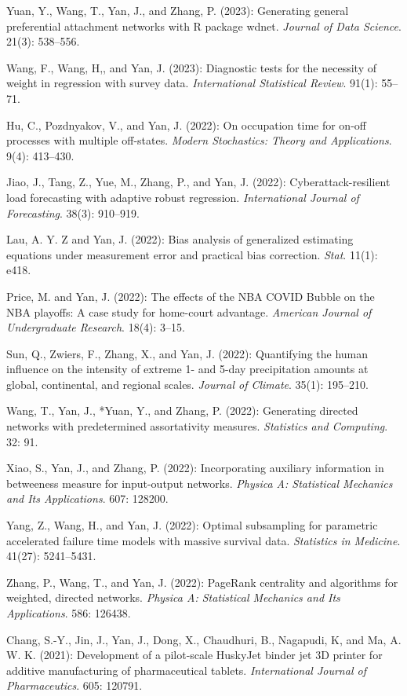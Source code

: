 \documentclass[Statistics]{vita}
\begin{document}
\begin{vita}
\begin{Publications}
\begin{RefereedJournalArticles}
  \item *Yuan, Y., Wang, T., Yan, J., and Zhang, P. (2023): Generating general preferential attachment networks with R package {wdnet}. {\em Journal of Data Science\/}. 21(3): 538--556.
  \item *Wang, F., Wang, H,, and Yan, J. (2023): Diagnostic tests for the necessity of weight in regression with survey data. {\em International Statistical Review\/}. 91(1): 55--71.
  \item *Hu, C., Pozdnyakov, V., and Yan, J. (2022): On occupation time for on-off processes with multiple off-states. {\em Modern Stochastics: Theory and Applications\/}. 9(4): 413--430.
  \item *Jiao, J., Tang, Z., Yue, M., Zhang, P., and Yan, J. (2022): Cyberattack-resilient load forecasting with adaptive robust regression. {\em International Journal of Forecasting\/}. 38(3): 910--919.
  \item *Lau, A. Y. Z and Yan, J. (2022): Bias analysis of generalized estimating equations under measurement error and practical bias correction. {\em Stat\/}. 11(1): e418.
  \item *Price, M. and Yan, J. (2022): The effects of the NBA COVID Bubble on the NBA playoffs: A case study for home-court advantage. {\em American Journal of Undergraduate Research\/}. 18(4): 3--15.
  \item Sun, Q., Zwiers, F., Zhang, X., and Yan, J. (2022): Quantifying the human influence on the intensity of extreme 1- and 5-day precipitation amounts at global, continental, and regional scales. {\em Journal of Climate\/}. 35(1): 195--210.
  \item Wang, T., Yan, J., *Yuan, Y., and Zhang, P. (2022): Generating directed networks with predetermined assortativity measures. {\em Statistics and Computing}. 32: 91.
  \item *Xiao, S., Yan, J., and Zhang, P. (2022): Incorporating auxiliary information in betweeness measure for input-output networks. {\em Physica A: Statistical Mechanics and Its Applications\/}. 607: 128200.
  \item *Yang, Z., Wang, H., and Yan, J. (2022): Optimal subsampling for parametric accelerated failure time models with massive survival data. {\em Statistics in Medicine}. 41(27): 5241--5431.
  \item Zhang, P., Wang, T., and Yan, J. (2022): PageRank centrality and algorithms for weighted, directed networks. {\em Physica A: Statistical Mechanics and Its Applications\/}. 586: 126438.
  \item Chang, S.-Y., Jin, J., Yan, J., Dong, X., Chaudhuri, B., Nagapudi, K, and Ma, A. W. K. (2021): Development of a pilot-scale HuskyJet binder jet 3D printer for additive manufacturing of pharmaceutical tablets. {\em International Journal of Pharmaceutics\/}. 605: 120791.

\end{RefereedJournalArticles}
\end{Publications}
\end{vita}
\end{document}
